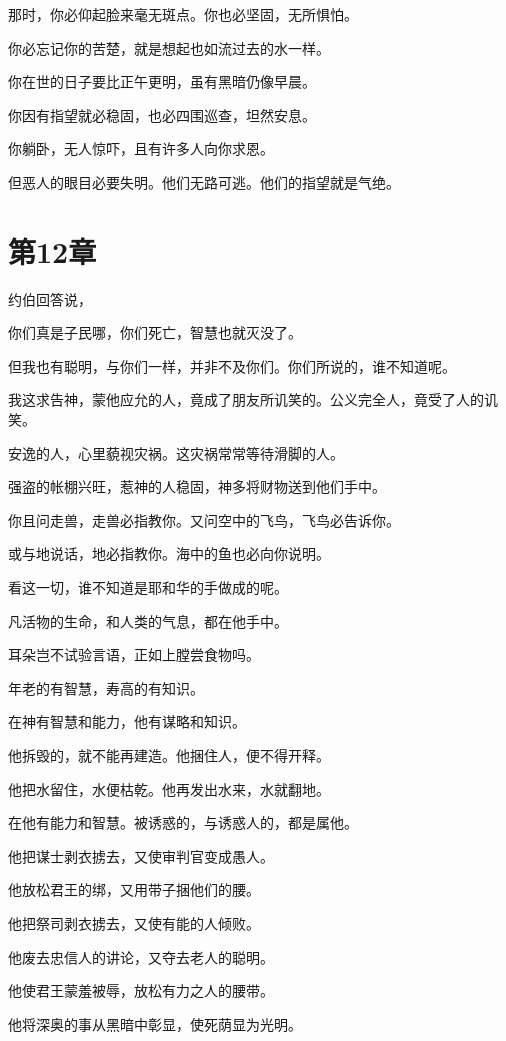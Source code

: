 \documentclass[12pt,oneside]{book}
\begin{document}
那时，你必仰起脸来毫无斑点。你也必坚固，无所惧怕。

你必忘记你的苦楚，就是想起也如流过去的水一样。

你在世的日子要比正午更明，虽有黑暗仍像早晨。

你因有指望就必稳固，也必四围巡查，坦然安息。

你躺卧，无人惊吓，且有许多人向你求恩。

但恶人的眼目必要失明。他们无路可逃。他们的指望就是气绝。



\chapter{第12章}
约伯回答说，

你们真是子民哪，你们死亡，智慧也就灭没了。

但我也有聪明，与你们一样，并非不及你们。你们所说的，谁不知道呢。

我这求告神，蒙他应允的人，竟成了朋友所讥笑的。公义完全人，竟受了人的讥笑。

安逸的人，心里藐视灾祸。这灾祸常常等待滑脚的人。

强盗的帐棚兴旺，惹神的人稳固，神多将财物送到他们手中。

你且问走兽，走兽必指教你。又问空中的飞鸟，飞鸟必告诉你。

或与地说话，地必指教你。海中的鱼也必向你说明。

看这一切，谁不知道是耶和华的手做成的呢。

凡活物的生命，和人类的气息，都在他手中。

耳朵岂不试验言语，正如上膛尝食物吗。

年老的有智慧，寿高的有知识。

在神有智慧和能力，他有谋略和知识。

他拆毁的，就不能再建造。他捆住人，便不得开释。

他把水留住，水便枯乾。他再发出水来，水就翻地。

在他有能力和智慧。被诱惑的，与诱惑人的，都是属他。

他把谋士剥衣掳去，又使审判官变成愚人。

他放松君王的绑，又用带子捆他们的腰。

他把祭司剥衣掳去，又使有能的人倾败。

他废去忠信人的讲论，又夺去老人的聪明。

他使君王蒙羞被辱，放松有力之人的腰带。

他将深奥的事从黑暗中彰显，使死荫显为光明。
\end{document}
